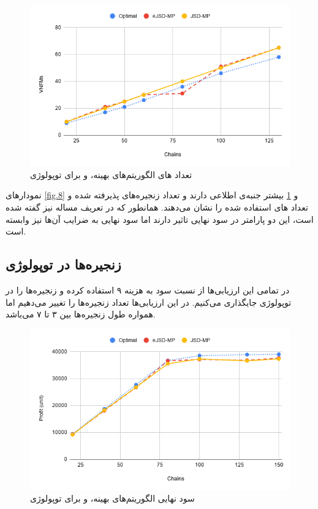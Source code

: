 \begin{figure}[h!]
\center\includegraphics[scale=.7]{images/chart-4}
\caption{تعداد های الگوریتم‌های بهینه،  و  برای توپولوژی }
\label{fig.9}
\end{figure}

نمودارهای \ref{fig.8} و \ref{fig.9}
بیشتر جنبه‌ی اطلاعی دارند و تعداد زنجیره‌های پذیرفته شده و تعداد
های
استفاده شده را نشان می‌دهند.
همانطور که در تعریف مساله نیز گفته شده است، این دو پارامتر در سود نهایی تاثیر دارند
اما سود نهایی به ضرایب آن‌ها نیز وابسته است.

\subsection{زنجیره‌ها در توپولوژی }

در تمامی این ارزیابی‌ها از نسبت سود به هزینه ۹ استفاده کرده و
زنجیره‌ها را در توپولوژی  جایگذاری می‌کنیم.
در این ارزیابی‌ها تعداد زنجیره‌ها را تغییر می‌دهیم اما همواره طول زنجیره‌ها بین ۳ تا ۷ می‌باشد.


\begin{figure}[h!]
\center\includegraphics[scale=.7]{images/chart-6}
\caption{سود نهایی الگوریتم‌های بهینه،  و  برای توپولوژی }
\label{fig.11}
\end{figure}


